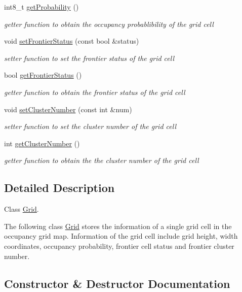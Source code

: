 \begin{DoxyCompactItemize}
int8\+\_\+t \hyperlink{classGrid_a8bdbc0a20221a1a3a0118fb032c21901}{get\+Probability} ()
\begin{DoxyCompactList}\small\item\em getter function to obtain the occupancy probablibility of the grid cell \end{DoxyCompactList}\item 
void \hyperlink{classGrid_a7e1184291fbc7028c0a50391e5f512f0}{set\+Frontier\+Status} (const bool \&status)
\begin{DoxyCompactList}\small\item\em setter function to set the frontier status of the grid cell \end{DoxyCompactList}\item 
bool \hyperlink{classGrid_ae95b1ff42726579e383565945f4044be}{get\+Frontier\+Status} ()
\begin{DoxyCompactList}\small\item\em getter function to obtain the frontier status of the grid cell \end{DoxyCompactList}\item 
void \hyperlink{classGrid_a8660a115b70a5b5e0e7bd4d1f1d3385d}{set\+Cluster\+Number} (const int \&num)
\begin{DoxyCompactList}\small\item\em setter function to set the cluster number of the grid cell \end{DoxyCompactList}\item 
int \hyperlink{classGrid_acd7fc68759fe10c71d0eac828922a1dc}{get\+Cluster\+Number} ()
\begin{DoxyCompactList}\small\item\em getter function to obtain the the cluster number of the grid cell \end{DoxyCompactList}\end{DoxyCompactItemize}


\subsection{Detailed Description}
Class \hyperlink{classGrid}{Grid}. 

The following class \hyperlink{classGrid}{Grid} stores the information of a single grid cell in the occupancy grid map. Information of the grid cell include grid height, width coordinates, occupancy probability, frontier cell status and frontier cluster number. 

\subsection{Constructor \& Destructor Documentation}
